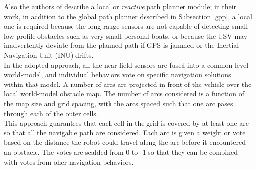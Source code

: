 \documentclass[12pt]{article}
\begin{document}
              \indent Also the authors of \parencite{Larson2007,Larson2007a} describe a local or \textit{reactive} path planner module; in their work, in addition to the global path planner described in Subsection \ref{gpp}, a local one is required because the long-range sensors are not capable of detecting small low-profile obstacles such as very small personal boats, or because the USV may inadvertently deviate from the planned path if GPS is jammed or the Inertial Navigation Unit (INU) drifts. \\
              In the adopted approach, all the near-field sensors are fused into a common level world-model, and individual behaviors vote on specific navigation solutions within that model. A number of arcs are projected in front of the vehicle over the local world-model obstacle map. The number of arcs considered is a function of the map size and grid spacing, with the arcs spaced such that one arc pases through each of the outer cells. \\
              This approach guarantees that each cell in the grid is covered by at least one arc so that all the navigable path are considered. Each arc is given a weight or vote based on the distance the robot could travel along the arc before it encountered an obstacle. The votes are scalded from 0 to -1 so that they can be combined with votes from oher navigation behaviors.
\end{document}
